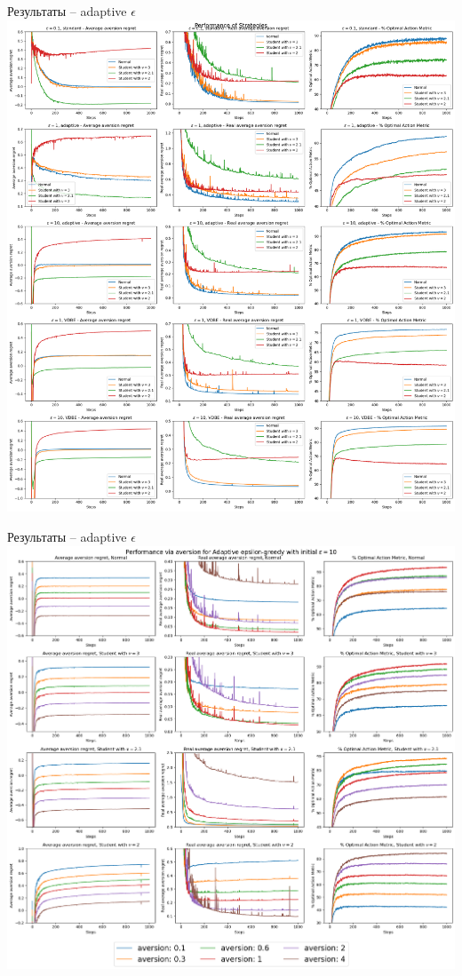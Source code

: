 \documentclass[11pt]{beamer} %
\begin{document}
    \begin{frame}{Результаты -- adaptive $\epsilon$}
        \includegraphics[scale=0.13,center]{images/theory_images/adaptive_epsilon/one_strat.png}
    \end{frame}
    \begin{frame}{Результаты -- adaptive $\epsilon$}
        \includegraphics[scale=0.13,center]{images/theory_images/adaptive_epsilon/avers_distr.png}
    \end{frame}
\end{document}
